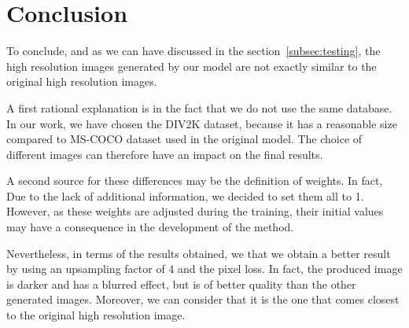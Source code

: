 \documentclass{article}
\begin{document}
{
    \section{Conclusion}
    \label{sec:conclusion}

    To conclude, and as we can have discussed in the section~\ref{subsec:testing}, the high resolution images generated by our model are not exactly similar to the original high resolution images. 
    
    A first rational explanation is in the fact that we do not use the same database. In our work, we have chosen the DIV2K dataset, because it has a reasonable size compared to MS-COCO dataset used in the original model. The choice of different images can therefore have an impact on the final results. 
    
    A second source for these differences may be the definition of weights. In fact, Due to the lack of additional information, we decided to set them all to 1. However, as these weights are adjusted during the training, their initial values may have a consequence in the development of the method. 

    Nevertheless, in terms of the results obtained, we that we obtain a better result by using an upsampling factor of 4 and the pixel loss. In fact, the produced image is darker and has a blurred effect, but is of better quality than the other generated images. Moreover, we can consider that it is the one that comes closest to the original high resolution image.
}

{
    
}
\end{document}
